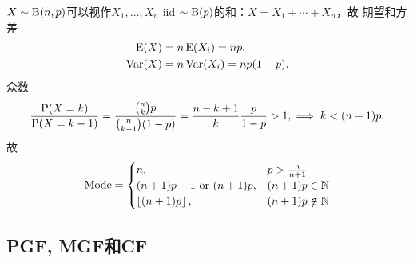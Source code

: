 $X\sim\Bino(n,p)$可以视作$X_1,\ldots,X_n$ iid $\sim\Bino(p)$的和：$X=X_1+\cdots+X_n$，故
期望和方差
\begin{subequations}
	\begin{align}
		\E(X)&=n\E(X_i)=np,\\
		\Var(X)&=n\Var(X_i)=np(1-p).
	\end{align}
\end{subequations}
众数
\[
	\frac{\P(X=k)}{\P(X=k-1)}=\frac{\binom nkp}{\binom n{k-1}(1-p)}=\frac{n-k+1}{k}\frac p{1-p}>1,
	\implies k<(n+1)p.
\]
故
\begin{equation}
	\text{Mode}=\begin{cases}
		n,&p>\frac{n}{n+1}\\
		(n+1)p-1\text{~or~}(n+1)p,&(n+1)p\in\NN\\
		\floor{(n+1)p},&(n+1)p\notin\NN
	\end{cases}
\end{equation}






\subsection{PGF, MGF和CF}

